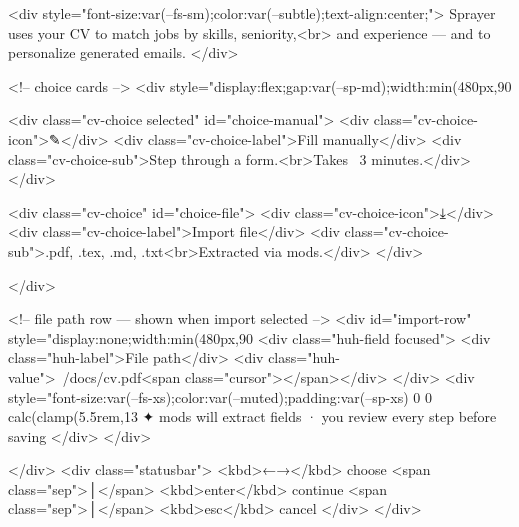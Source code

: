 {{{{{{{{{{{{{{    <div style="font-size:var(--fs-sm);color:var(--subtle);text-align:center;">
      Sprayer uses your CV to match jobs by skills, seniority,<br>
      and experience — and to personalize generated emails.
    </div>

    <!-- choice cards -->
    <div style="display:flex;gap:var(--sp-md);width:min(480px,90%

      <div class="cv-choice selected" id="choice-manual">
        <div class="cv-choice-icon">✎</div>
        <div class="cv-choice-label">Fill manually</div>
        <div class="cv-choice-sub">Step through a form.<br>Takes ~3 minutes.</div>
      </div>

      <div class="cv-choice" id="choice-file">
        <div class="cv-choice-icon">⤓</div>
        <div class="cv-choice-label">Import file</div>
        <div class="cv-choice-sub">.pdf, .tex, .md, .txt<br>Extracted via mods.</div>
      </div>

    </div>

    <!-- file path row — shown when import selected -->
    <div id="import-row" style="display:none;width:min(480px,90%
      <div class="huh-field focused">
        <div class="huh-label">File path</div>
        <div class="huh-value">~/docs/cv.pdf<span class="cursor"></span></div>
      </div>
      <div style="font-size:var(--fs-xs);color:var(--muted);padding:var(--sp-xs) 0 0 calc(clamp(5.5rem,13%
        ✦ mods will extract fields · you review every step before saving
      </div>
    </div>

  </div>
  <div class="statusbar">
    <kbd>←→</kbd> choose <span class="sep">│</span>
    <kbd>enter</kbd> continue <span class="sep">│</span>
    <kbd>esc</kbd> cancel
  </div>
</div>

}}}}}}}}}}}}}}
